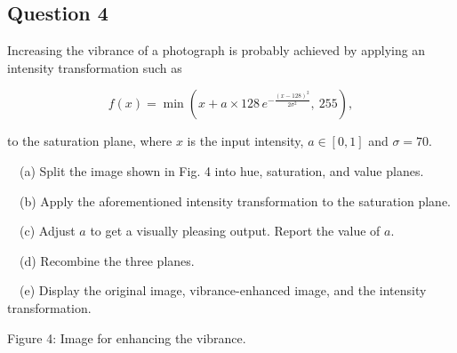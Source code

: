 \documentclass[10pt]{article}
\begin{document}
    \begin{center}
    \end{center}
    
    \begin{center}
    \end{center}
    

\subsection{Question 4}\label{question-4}

Increasing the vibrance of a photograph is probably achieved by applying
an intensity transformation such as

\[
f(x) = \min\left(x + a \times 128\, e^{-\frac{(x-128)^2}{2\sigma^2}},\ 255\right),
\]

to the saturation plane, where \(x\) is the input intensity,
\(a \in [0, 1]\) and \(\sigma = 70\).

~~(a) Split the image shown in Fig. 4 into hue, saturation, and value
planes.

~~(b) Apply the aforementioned intensity transformation to the
saturation plane.

~~(c) Adjust \(a\) to get a visually pleasing output. Report the value
of \(a\).

~~(d) Recombine the three planes.

~~(e) Display the original image, vibrance-enhanced image, and the
intensity transformation.

Figure 4: Image for enhancing the vibrance.
\end{document}
